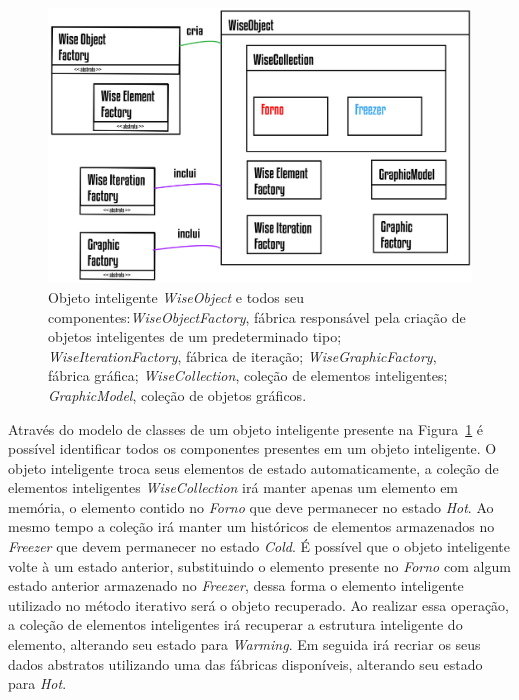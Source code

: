 \documentclass[a4paper,12pt]{monografia}
\theoremstyle{plain}
\theoremstyle{definition}
\theoremstyle{remark}
\begin{document}
\begin{figure}[!htbp]
	\centering
	\includegraphics[scale=1.15]{Figures/WiseObject@16x.png}
	\caption{Objeto inteligente \textit{WiseObject} e todos seu componentes:\textit{WiseObjectFactory}, fábrica responsável pela criação de objetos inteligentes de um predeterminado tipo; \textit{WiseIterationFactory}, fábrica de iteração; \textit{WiseGraphicFactory}, fábrica gráfica; \textit{WiseCollection}, coleção de elementos inteligentes; \textit{GraphicModel}, coleção de objetos gráficos.}
	\label{fig7:wiseobject}
\end{figure}

Através do modelo de classes de um objeto inteligente presente na Figura~\ref{fig7:wiseobject} é possível identificar todos os componentes presentes em um objeto inteligente. O objeto inteligente troca seus elementos de estado automaticamente, a coleção de elementos inteligentes \textit{WiseCollection} irá manter apenas um elemento em memória, o elemento contido no \textit{Forno} que deve permanecer no estado \textit{Hot}. Ao mesmo tempo a coleção irá manter um históricos de elementos armazenados no \textit{Freezer} que devem permanecer no estado \textit{Cold}. É possível que o objeto inteligente volte à um estado anterior, substituindo o elemento presente no \textit{Forno} com algum estado anterior armazenado no \textit{Freezer}, dessa forma o elemento inteligente utilizado no método iterativo será o objeto recuperado. Ao realizar essa operação, a coleção de elementos inteligentes irá recuperar a estrutura inteligente do elemento, alterando seu estado para \textit{Warming}. Em seguida irá recriar os seus dados abstratos utilizando uma das fábricas disponíveis, alterando seu estado para \textit{Hot}.
\end{document}

